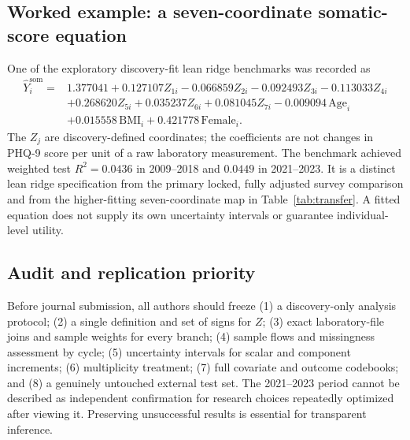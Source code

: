 \documentclass[11pt,a4paper]{article}
\newcommand{\Rtwo}{R^{2}}
\begin{document}
\subsection{Worked example: a seven-coordinate somatic-score equation}
One of the exploratory discovery-fit lean ridge benchmarks was recorded as
\begin{align}
\widehat{Y}_i^{\mathrm{som}}={}&1.377041+0.127107Z_{1i}-0.066859Z_{2i}
-0.092493Z_{3i}-0.113033Z_{4i}\nonumber\\
&+0.268620Z_{5i}+0.035237Z_{6i}+0.081045Z_{7i}
-0.009094\,\mathrm{Age}_i\nonumber\\
&+0.015558\,\mathrm{BMI}_i+0.421778\,\mathrm{Female}_i.
\label{eq:example}
\end{align}
The $Z_j$ are discovery-defined coordinates; the coefficients are not changes in PHQ-9 score per unit of a raw laboratory measurement. The benchmark achieved weighted test $\Rtwo=0.0436$ in 2009--2018 and $0.0449$ in 2021--2023. It is a distinct lean ridge specification from the primary locked, fully adjusted survey comparison and from the higher-fitting seven-coordinate map in Table~\ref{tab:transfer}. A fitted equation does not supply its own uncertainty intervals or guarantee individual-level utility.

\subsection{Audit and replication priority}
Before journal submission, all authors should freeze (1) a discovery-only analysis protocol; (2) a single definition and set of signs for $Z$; (3) exact laboratory-file joins and sample weights for every branch; (4) sample flows and missingness assessment by cycle; (5) uncertainty intervals for scalar and component increments; (6) multiplicity treatment; (7) full covariate and outcome codebooks; and (8) a genuinely untouched external test set. The 2021--2023 period cannot be described as independent confirmation for research choices repeatedly optimized after viewing it. Preserving unsuccessful results is essential for transparent inference.
\end{document}
